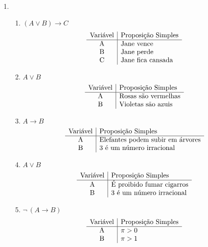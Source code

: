 		\begin{enumerate}
			\item
			\begin{enumerate}
							
			\item  $(A \lor B) \to C$
			\[\begin{array}{c|l} 		
			\text{Vari\'avel} & \text{Proposi\c{c}\~ao Simples} \\ \hline
   			$A$        & \text{Jane vence}\\ 
   			$B$        & \text{Jane perde}\\
   			$C$        & \text{Jane fica cansada} \\									
			\end{array}
			\]			
										
			\item  $A \lor B$
			\[\begin{array}{c|l} 		
			\text{Vari\'avel} & \text{Proposi\c{c}\~ao Simples} \\ \hline
   			$A$        & \text{Rosas s\~ao vermelhas}\\ 
   			$B$        & \text{Violetas s\~ao azuis}\\											
			\end{array}
			\]
		
			\item  $A \to B$
			\[\begin{array}{c|l} 
			\text{Vari\'avel} & \text{Proposi\c{c}\~ao Simples} \\ \hline
			$A$        & \text{Elefantes podem subir em \'arvores}\\ 
			$B$        & \text{3 \'e um n\'umero irracional}\\
			\end{array}
			\]
					
			\item $A \lor B$
			\[\begin{array}{c|l} 
			\text{Vari\'avel} & \text{Proposi\c{c}\~ao Simples} \\ \hline
			$A$        & \text{\'E proibido fumar cigarros}\\ 
			$B$        & \text{3 \'e um n\'umero irracional}\\
			\end{array}
			\]												
			
			\item $ \neg \,(A \to B )$
			\[\begin{array}{c|l} 
			\text{Vari\'avel} & \text{Proposi\c{c}\~ao Simples} \\ \hline
			$A$        & \pi > 0\\ 
			$B$        & \pi > 1\\
			\end{array}
			\]
			

\end{enumerate}
\end{enumerate}
